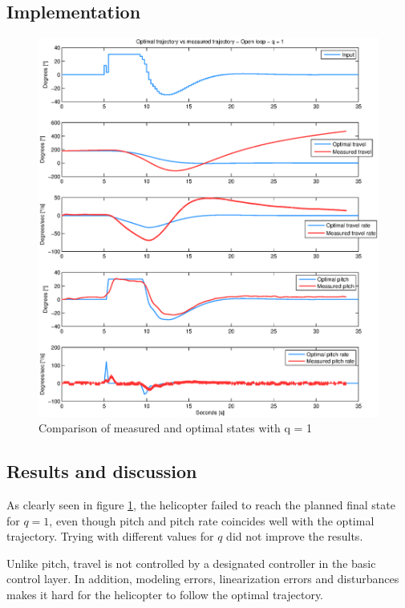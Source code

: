\documentclass[11pt,a4paper,USenglish]{article} %
\begin{document}
\newpage
\subsection{Implementation}
\begin{figure}[!h]
    \begin{minipage}{\textwidth}
  \centerline{\includegraphics[width=1.3\textwidth]{opg2_compare_q1}}
	\caption{Comparison of measured and optimal states with q = 1}
    \end{minipage}
	\label{fig:q01}
\end{figure}
\newpage
\subsection{Results and discussion}
As clearly seen in figure \ref{fig:q01}, the helicopter failed to reach the planned final state for $q = 1$, even though pitch and pitch rate coincides well with the optimal trajectory. Trying with different values for $q$ did not improve the results.

Unlike pitch, travel is not controlled by a designated controller in the basic control layer. In addition, modeling errors, linearization errors and disturbances makes it hard for the helicopter to follow the optimal trajectory.
\end{document}
